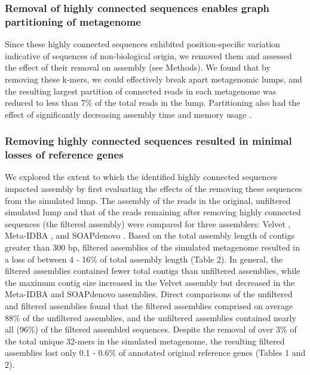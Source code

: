 \documentclass[10pt]{article}
\begin{document}
\subsubsection*{Removal of highly connected sequences enables graph partitioning of metagenome}

Since these highly connected sequences exhibited position-specific
variation indicative of sequences of non-biological origin, we removed
them and assessed the effect of their removal on assembly (see
Methods).  We found that by removing these k-mers, we could
effectively break apart metagenomic lumps, and the resulting largest
partition of connected reads in each metagenome was reduced to less
than 7\% of the total reads in the lump.  Partitioning also had the
effect of significantly decreasing assembly time and memory usage
\cite{Pell:2012cq}.

\subsubsection*{Removing highly connected sequences resulted in minimal losses of reference genes}

We explored the extent
to which the identified highly connected
sequences impacted assembly by first evaluating the effects of the
removing these sequences from the simulated lump.  The assembly of the reads in the original,
unfiltered simulated lump and that of the reads remaining after
removing highly connected sequences (the filtered assembly) were
compared for three assemblers: Velvet \cite{Zerbino:2008p665}, Meta-IDBA \cite{Peng:2011p898}, and SOAPdenovo \cite{Li:2010p234}.
Based on the total assembly length of contigs greater than 300 bp,
filtered assemblies of the simulated metagenome resulted in a loss of
between 4 - 16\% of total assembly length (Table 2).  In general, the
filtered assemblies contained fewer total contigs than unfiltered
assemblies, while the maximum contig size increased in the Velvet
assembly but decreased in the Meta-IDBA and SOAPdenovo assemblies.
Direct comparisons of the unfiltered and filtered assemblies found
that the filtered assemblies comprised on average 88\% of the
unfiltered assemblies, and the unfiltered assemblies contained nearly
all (96\%) of the filtered assembled sequences.  Despite the removal
of over 3\% of the total unique 32-mers in the simulated metagenome,
the resulting filtered assemblies lost only 0.1 -
0.6\% of annotated original reference genes (Tables 1 and 2).
\end{document}
